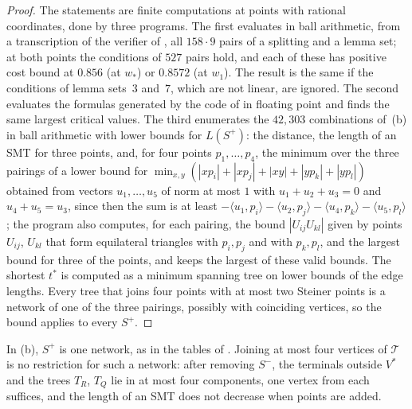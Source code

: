 \documentclass[11pt]{amsart}
\theoremstyle{definition}
\theoremstyle{remark}
\numberwithin{equation}{section}
\newcommand{\NCOMBO}{42{,}303}
\begin{document}
\begin{proof}
The statements are finite computations at points with rational coordinates, done by three programs. The first evaluates in ball arithmetic, from a transcription of the verifier of \cite{KHSHGW}, all $158\cdot9$ pairs of a splitting and a lemma set; at both points the conditions of $527$ pairs hold, and each of these has positive cost bound at $0.856$ (at $w_*$) or $0.8572$ (at $w_1$). The result is the same if the conditions of lemma sets~$3$ and~$7$, which are not linear, are ignored. The second evaluates the formulas generated by the code of \cite{KHSHGW} in floating point and finds the same largest critical values. The third enumerates the $\NCOMBO$ combinations of~(b) in ball arithmetic with lower bounds for $L(S^+)$: the distance, the length of an SMT for three points, and, for four points $p_1,\dots,p_4$, the minimum over the three pairings of a lower bound for $\min_{x,y}(|xp_i|+|xp_j|+|xy|+|yp_k|+|yp_l|)$ obtained from vectors $u_1,\dots,u_5$ of norm at most $1$ with $u_1+u_2+u_3=0$ and $u_4+u_5=u_3$, since then the sum is at least $-\langle u_1,p_i\rangle-\langle u_2,p_j\rangle-\langle u_4,p_k\rangle-\langle u_5,p_l\rangle$; the program also computes, for each pairing, the bound $|U_{ij}U_{kl}|$ given by points $U_{ij}$, $U_{kl}$ that form equilateral triangles with $p_i,p_j$ and with $p_k,p_l$, and the largest bound for three of the points, and keeps the largest of these valid bounds. The shortest $t^*$ is computed as a minimum spanning tree on lower bounds of the edge lengths. Every tree that joins four points with at most two Steiner points is a network of one of the three pairings, possibly with coinciding vertices, so the bound applies to every $S^+$.
\end{proof}

In (b), $S^+$ is one network, as in the tables of \cite{KHSHGW}. Joining at most four vertices of $\mathcal T$ is no restriction for such a network: after removing $S^-$, the terminals outside $V^*$ and the trees $T_R$, $T_Q$ lie in at most four components, one vertex from each suffices, and the length of an SMT does not decrease when points are added.
\end{document}
